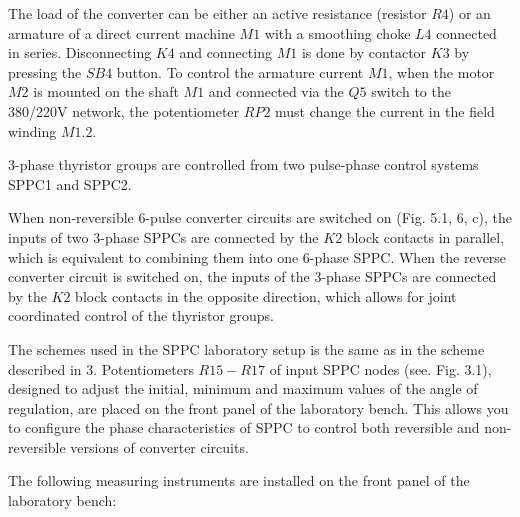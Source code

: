 \documentclass[a4paper,14pt]{article}
\begin{document}
The load of the converter can be either an active resistance (resistor $R4$) or an armature of a direct current machine $M1$ with a smoothing choke $L4$ connected in series.
Disconnecting $K4$ and connecting $M1$ is done by contactor $K3$ by pressing the $SB4$ button.
To control the armature current $M1$, when the motor $M2$ is mounted on the shaft $M1$ and connected via the $Q5$ switch to the 380/220V network, the potentiometer $RP2$ must change the current in the field winding $M1.2$.

3-phase thyristor groups are controlled from two pulse-phase control systems SPPC1 and SPPC2.

When non-reversible 6-pulse converter circuits are switched on (Fig. 5.1, 6, c), the inputs of two 3-phase SPPCs are connected by the $K2$ block contacts in parallel, which is equivalent to combining them into one 6-phase SPPC.
When the reverse converter circuit is switched on, the inputs of the 3-phase SPPCs are connected by the $K2$ block contacts in the opposite direction, which allows for joint coordinated control of the thyristor groups.

The schemes used in the SPPC laboratory setup is the same as in the scheme described in 3.
Potentiometers $R15-R17$ of input SPPC nodes (see. Fig. 3.1), designed to adjust the initial, minimum and maximum values of the angle of regulation, are placed on the front panel of the laboratory bench.
This allows you to configure the phase characteristics of SPPC to control both reversible and non-reversible versions of converter circuits.

The following measuring instruments are installed on the front panel of the laboratory bench:
\end{document}
